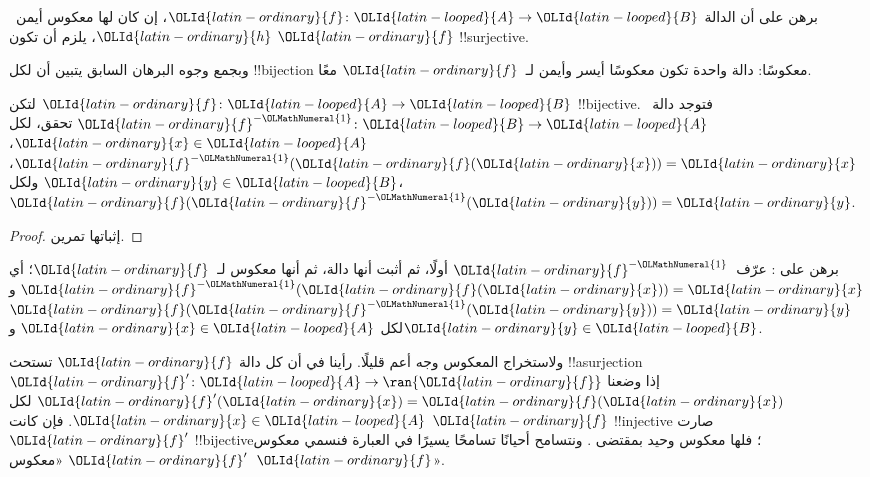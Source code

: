 \documentclass[../../../include/open-logic-section]{subfiles}
\begin{document}
\begin{prob}
برهن على أن الدالة ${\OLId{latin-ordinary}{f}}\colon {\OLId{latin-looped}{A}} \to {\OLId{latin-looped}{B}}$، إن كان لها معكوس أيمن~${\OLId{latin-ordinary}{h}}$، يلزم
أن تكون ${\OLId{latin-ordinary}{f}}$ !!{surjective}.
\end{prob}

\begin{explain}
وبجمع وجوه البرهان السابق يتبين أن لكل !!{bijection} معكوسًا:
دالة واحدة تكون معكوسًا أيسر وأيمن لـ~${\OLId{latin-ordinary}{f}}$ معًا.
\end{explain}

\begin{prop}
لتكن ${\OLId{latin-ordinary}{f}}\colon {\OLId{latin-looped}{A}} \to {\OLId{latin-looped}{B}}$ !!{bijective}. فتوجد
دالة~${\OLId{latin-ordinary}{f}}^{-{\OLMathNumeral{1}}}\colon {\OLId{latin-looped}{B}} \to {\OLId{latin-looped}{A}}$ تحقق، لكل ${\OLId{latin-ordinary}{x}} \in {\OLId{latin-looped}{A}}$،
${\OLId{latin-ordinary}{f}}^{-{\OLMathNumeral{1}}}({\OLId{latin-ordinary}{f}}({\OLId{latin-ordinary}{x}})) = {\OLId{latin-ordinary}{x}}$، ولكل ${\OLId{latin-ordinary}{y}} \in {\OLId{latin-looped}{B}}$، ${\OLId{latin-ordinary}{f}}({\OLId{latin-ordinary}{f}}^{-{\OLMathNumeral{1}}}({\OLId{latin-ordinary}{y}})) = {\OLId{latin-ordinary}{y}}$.
\end{prop}

\begin{proof}
إثباتها تمرين.
\end{proof}

\begin{prob}
برهن على : عرّف~${\OLId{latin-ordinary}{f}}^{-{\OLMathNumeral{1}}}$
أولًا، ثم أثبت أنها دالة، ثم أنها معكوس لـ~${\OLId{latin-ordinary}{f}}$؛ أي
${\OLId{latin-ordinary}{f}}^{-{\OLMathNumeral{1}}}({\OLId{latin-ordinary}{f}}({\OLId{latin-ordinary}{x}})) = {\OLId{latin-ordinary}{x}}$ و${\OLId{latin-ordinary}{f}}({\OLId{latin-ordinary}{f}}^{-{\OLMathNumeral{1}}}({\OLId{latin-ordinary}{y}})) = {\OLId{latin-ordinary}{y}}$ لكل ${\OLId{latin-ordinary}{x}} \in {\OLId{latin-looped}{A}}$ و${\OLId{latin-ordinary}{y}} \in {\OLId{latin-looped}{B}}$.
\end{prob}

\begin{explain}
ولاستخراج المعكوس وجه أعم قليلًا. رأينا في  أن كل
دالة ${\OLId{latin-ordinary}{f}}$ تستحث !!a{surjection} ${\OLId{latin-ordinary}{f}}' \colon {\OLId{latin-looped}{A}} \to \ran{{\OLId{latin-ordinary}{f}}}$ إذا وضعنا
${\OLId{latin-ordinary}{f}}'({\OLId{latin-ordinary}{x}}) = {\OLId{latin-ordinary}{f}}({\OLId{latin-ordinary}{x}})$ لكل ${\OLId{latin-ordinary}{x}} \in {\OLId{latin-looped}{A}}$. فإن كانت ${\OLId{latin-ordinary}{f}}$ !!{injective} صارت
${\OLId{latin-ordinary}{f}}'$ !!{bijective}؛ فلها معكوس وحيد بمقتضى .
ونتسامح أحيانًا تسامحًا يسيرًا في العبارة فنسمي معكوس ${\OLId{latin-ordinary}{f}}'$
«معكوس~${\OLId{latin-ordinary}{f}}$».
\end{explain}
\end{document}
